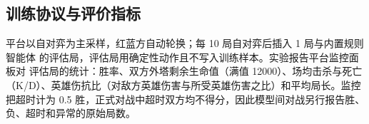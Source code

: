 \subsection{训练协议与评价指标}
\label{sec:protocol}

平台以自对弈为主采样，红蓝方自动轮换；每 \num{10} 局自对弈后插入 \num{1} 局与内置规则智能体  的评估局，评估局用确定性动作且不写入训练样本\cite{kaiwu63}。实验报告平台监控面板对  评估局的统计：胜率、双方外塔剩余生命值（满值 \num{12000}）、场均击杀与死亡（K/D）、英雄伤抗比（对敌方英雄伤害与所受英雄伤害之比）和平均局长。监控把超时计为 \num{0.5} 胜，正式对战中超时双方均不得分，因此模型间对战另行报告胜、负、超时和异常的原始局数。
